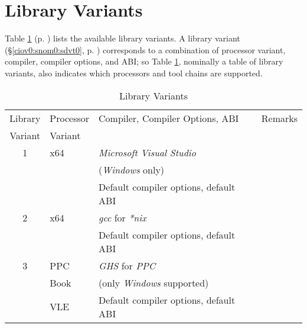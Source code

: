 \section{Library Variants}
\label{cldd0:sscc0}

Table \ref{tbl:cldd0:sscc0:01} (p.  
\pageref{tbl:cldd0:sscc0:01}) lists the available library 
variants.  A library variant (\S{}\ref{ciov0:snom0:sdvt0}, 
p.  \pageref{ciov0:snom0:sdvt0}) corresponds to a 
combination of processor variant, compiler, compiler 
options, and ABI; so Table \ref{tbl:cldd0:sscc0:01}, 
nominally a table of library variants, also indicates which 
processors and tool chains are supported.  

\begin{table}
\caption{\emph{\productbasenameshort{}} Library Variants}
\label{tbl:cldd0:sscc0:01}
\begin{center}
\begin{tabular}{|c|l|l|l|}
\hline
Library & Processor & Compiler, Compiler Options, ABI                         & Remarks                               \\
Variant & Variant   &                                                         &                                       \\
\hline
\hline
   1    & x64       & \emph{Microsoft Visual Studio}                          &                                       \\
        &           & (\index{Windows@\emph{Windows}}\emph{Windows} only)     &                                       \\
        &           & Default compiler options, default ABI                   &                                       \\
\hline
   2    & x64       & \emph{gcc} for \index{----nix@\emph{*nix}}\emph{*nix}   &                                       \\
        &           & Default compiler options, default ABI                   &                                       \\
\hline
   3    & PPC       & \emph{GHS} for \emph{PPC}                               &                                       \\
        & Book      & (only \emph{Windows} supported)                         &                                       \\
        & VLE       & Default compiler options, default ABI                   &                                       \\
\hline
\end{tabular}
\end{center}
\end{table}

